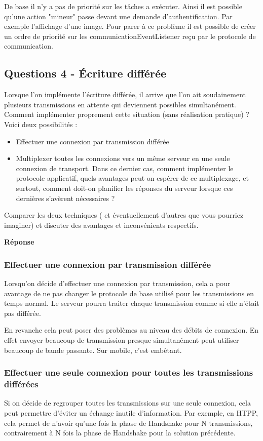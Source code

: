 \documentclass[francais,12pt]{article}
\begin{document}
	De base il n'y a pas de priorité sur les tâches a exécuter. Ainsi il est possible qu'une action "mineur" passe devant une demande d'authentification. Par exemple l'affichage d'une image. Pour parer à ce problème il est possible de créer un ordre de priorité sur les communicationEventListener reçu par le protocole de communication. 
	
	\subsection*{Questions 4 - Écriture différée}    
	Lorsque l'on implémente l'écriture différée, il arrive que l'on ait soudainement plusieurs transmissions en attente qui deviennent possibles simultanément. Comment implémenter proprement cette situation (sans réalisation pratique) ? Voici deux possibilités :
	\begin{itemize}
		\item Effectuer une connexion par transmission différée
		\item Multiplexer toutes les connexions vers un même serveur en une seule connexion de transport. Dans ce dernier cas, comment implémenter le protocole applicatif, quels avantages peut-on espérer de ce multiplexage, et surtout, comment doit-on planifier les réponses du serveur lorsque ces dernières s'avèrent nécessaires ?
	\end{itemize}
	
	Comparer les deux techniques ( et éventuellement d'autres que vous pourriez imaginer) et discuter des avantages et inconvénients respectifs.
	
	{\color[rgb]{0,0.5,0.23}\textbf{Réponse}}
	
	\subsubsection*{Effectuer une connexion par transmission différée}
	Lorsqu'on décide d'effectuer une connexion par transmission, cela a pour avantage de ne pas changer le protocole de base utilisé pour les transmissions en temps normal. Le serveur pourra traiter chaque transmission comme si elle n'était pas différée. 
	
	En revanche cela peut poser des problèmes au niveau des débits de connexion. En effet envoyer beaucoup de transmission presque simultanément peut utiliser beaucoup de bande passante. Sur mobile, c'est embêtant. 
	\subsubsection*{Effectuer une seule connexion pour toutes les transmissions différées}
	Si on décide de regrouper toutes les transmissions sur une seule connexion, cela peut permettre d'éviter un échange inutile d'information. Par exemple, en HTPP, cela permet de n'avoir qu'une fois la phase de Handshake pour N transmissions, contrairement à N fois la phase de Handshake pour la solution précédente. 
	
\end{document}
